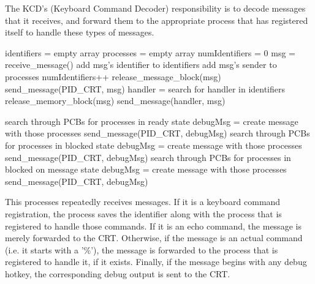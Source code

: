 \documentclass[12pt]{report}
\begin{document}
The KCD's (Keyboard Command Decoder) responsibility is to decode messages that it receives, and forward them to the appropriate process that has registered itself to handle these types of messages. 

\begin{algorithmic}[1]
    \State identifiers = empty array
    \State processes = empty array
    \State numIdentifiers = 0
      \State msg = receive\_message()
        \State add msg's identifier to identifiers
        \State add msg's sender to processes
        \State numIdentifiers++
        \State release\_message\_block(msg)
        \State send\_message(PID\_CRT, msg)
      \Else
          \State handler = search for handler in identifiers
        \EndIf
          \State release\_memory\_block(msg)
        \Else
          \State send\_message(handler, msg)
        \EndIf

          \State search through PCBs for processes in ready state
          \State debugMsg = create message with those processes
          \State send\_message(PID\_CRT, debugMsg)
          \State search through PCBs for processes in blocked state
          \State debugMsg = create message with those processes
          \State send\_message(PID\_CRT, debugMsg)
          \State search through PCBs for processes in blocked on message state
          \State debugMsg = create message with those processes
          \State send\_message(PID\_CRT, debugMsg)
        \EndIf
      \EndIf
    \EndWhile 
  \EndFunction
\end{algorithmic}

This processes repeatedly receives messages. If it is a keyboard command registration, the process saves the identifier along with the process that is registered to handle those commands. If it is an echo command, the message is merely forwarded to the CRT. Otherwise, if the message is an actual command (i.e. it starts with a '\%'), the message is forwarded to the process that is registered to handle it, if it exists. Finally, if the message begins with any debug hotkey, the corresponding debug output is sent to the CRT.

\end{document}
